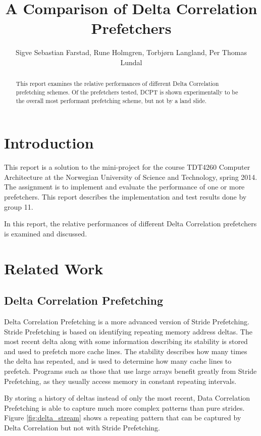 \documentclass[a4paper]{IEEEtran}
\title{A Comparison of Delta Correlation Prefetchers}
\author{
    Sigve Sebastian Farstad,
    Rune Holmgren,
    Torbjørn Langland,
    Per Thomas Lundal
}
\begin{document}
\maketitle

\begin{abstract}
    This report examines the relative performances of different Delta Correlation prefetching schemes.
    Of the prefetchers tested, DCPT is shown experimentally to be the overall most performant prefetching scheme, but not by a land slide.

\end{abstract}

\section{Introduction}

This report is a solution to the mini-project for the course TDT4260 Computer Architecture at the Norwegian University of Science and Technology, spring 2014.
The assignment is to implement and evaluate the performance of one or more prefetchers. This report describes the implementation and test results done by group 11.

In this report, the relative performances of different Delta Correlation prefetchers is examined and discussed.

\section{Related Work}

\subsection{Delta Correlation Prefetching}

Delta Correlation Prefetching is a more advanced version of Stride Prefetching.
Stride Prefetching is based on identifying repeating memory address deltas.
The most recent delta along with some information describing its stability is stored and used to prefetch more cache lines.
The stability describes how many times the delta has repeated, and is used to determine how many cache lines to prefetch.
Programs such as those that use large arrays benefit greatly from Stride Prefetching, as they usually access memory in constant repeating intervals.

By storing a history of deltas instead of only the most recent, Data Correlation Prefetching is able to capture much more complex patterns than pure strides.
Figure \ref{fig:delta_stream} shows a repeating pattern that can be captured by Delta Correlation but not with Stride Prefetching.
\end{document}
